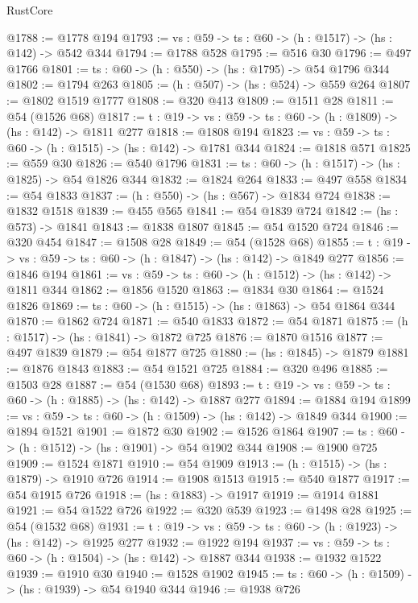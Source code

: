 \begin{lexlean}{RustCore}
\begin{coremodule}
@1788 := @1778 @194
@1793 := {vs : @59} -> {ts : @60} -> (h : @1517) -> (hs : @142) -> @542 @344
@1794 := @1788 @528
@1795 := @516 @30
@1796 := @497 @1766
@1801 := {ts : @60} -> (h : @550) -> (hs : @1795) -> @54 @1796 @344
@1802 := @1794 @263
@1805 := (h : @507) -> (hs : @524) -> @559 @264
@1807 := @1802 @1519 @1777
@1808 := @320 @413
@1809 := @1511 @28
@1811 := @54 (@1526 @68)
@1817 := {t : @19} -> {vs : @59} -> {ts : @60} -> (h : @1809) -> (hs : @142) -> @1811 @277
@1818 := @1808 @194
@1823 := {vs : @59} -> {ts : @60} -> (h : @1515) -> (hs : @142) -> @1781 @344
@1824 := @1818 @571
@1825 := @559 @30
@1826 := @540 @1796
@1831 := {ts : @60} -> (h : @1517) -> (hs : @1825) -> @54 @1826 @344
@1832 := @1824 @264
@1833 := @497 @558
@1834 := @54 @1833
@1837 := (h : @550) -> (hs : @567) -> @1834 @724
@1838 := @1832 @1518
@1839 := @455 @565
@1841 := @54 @1839 @724
@1842 := (hs : @573) -> @1841
@1843 := @1838 @1807
@1845 := @54 @1520 @724
@1846 := @320 @454
@1847 := @1508 @28
@1849 := @54 (@1528 @68)
@1855 := {t : @19} -> {vs : @59} -> {ts : @60} -> (h : @1847) -> (hs : @142) -> @1849 @277
@1856 := @1846 @194
@1861 := {vs : @59} -> {ts : @60} -> (h : @1512) -> (hs : @142) -> @1811 @344
@1862 := @1856 @1520
@1863 := @1834 @30
@1864 := @1524 @1826
@1869 := {ts : @60} -> (h : @1515) -> (hs : @1863) -> @54 @1864 @344
@1870 := @1862 @724
@1871 := @540 @1833
@1872 := @54 @1871
@1875 := (h : @1517) -> (hs : @1841) -> @1872 @725
@1876 := @1870 @1516
@1877 := @497 @1839
@1879 := @54 @1877 @725
@1880 := (hs : @1845) -> @1879
@1881 := @1876 @1843
@1883 := @54 @1521 @725
@1884 := @320 @496
@1885 := @1503 @28
@1887 := @54 (@1530 @68)
@1893 := {t : @19} -> {vs : @59} -> {ts : @60} -> (h : @1885) -> (hs : @142) -> @1887 @277
@1894 := @1884 @194
@1899 := {vs : @59} -> {ts : @60} -> (h : @1509) -> (hs : @142) -> @1849 @344
@1900 := @1894 @1521
@1901 := @1872 @30
@1902 := @1526 @1864
@1907 := {ts : @60} -> (h : @1512) -> (hs : @1901) -> @54 @1902 @344
@1908 := @1900 @725
@1909 := @1524 @1871
@1910 := @54 @1909
@1913 := (h : @1515) -> (hs : @1879) -> @1910 @726
@1914 := @1908 @1513
@1915 := @540 @1877
@1917 := @54 @1915 @726
@1918 := (hs : @1883) -> @1917
@1919 := @1914 @1881
@1921 := @54 @1522 @726
@1922 := @320 @539
@1923 := @1498 @28
@1925 := @54 (@1532 @68)
@1931 := {t : @19} -> {vs : @59} -> {ts : @60} -> (h : @1923) -> (hs : @142) -> @1925 @277
@1932 := @1922 @194
@1937 := {vs : @59} -> {ts : @60} -> (h : @1504) -> (hs : @142) -> @1887 @344
@1938 := @1932 @1522
@1939 := @1910 @30
@1940 := @1528 @1902
@1945 := {ts : @60} -> (h : @1509) -> (hs : @1939) -> @54 @1940 @344
@1946 := @1938 @726

\end{coremodule}
\end{lexlean}
